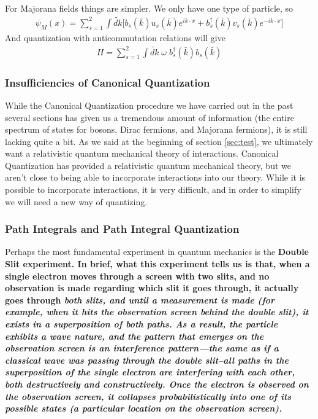 \documentclass[12pt,epsf]{article}
\def\nolabel{\nonumber }
\def\nolabel{\nonumber }
\begin{document}
For Majorana fields things are simpler.  We only have one type of
particle, so 
\begin{eqnarray}
\psi_M(x) = \sum_{s=1}^2 \int \widetilde{dk}\big[b_s(\bar k)u_s(\bar
k)e^{ik\cdot x} + b^{\dagger}_s(\bar k)v_s(\bar k)e^{-ik\cdot
x}\big]\nolabel
\end{eqnarray}
And quantization with anticommutation relations will give
\begin{eqnarray}
H = \sum_{s=1}^2\int \widetilde{dk}\; \omega \; b^{\dagger}_s(\bar k
)b_s(\bar k )\nolabel
\end{eqnarray}

\subsubsection{Insufficiencies of Canonical Quantization}

While the Canonical Quantization procedure we have carried out in the
past several sections has given us a tremendous amount of information
(the entire spectrum of states for bosons, Dirac fermions, and Majorana
fermions), it is still lacking quite a bit.  As we said at the
beginning of section \ref{sec:test}, we ultimately want a relativistic
quantum mechanical theory of interactions.  Canonical Quantization has
provided a relativistic quantum mechanical theory, but we aren't close
to being able to incorporate interactions into our theory.  While it is
possible to incorporate interactions, it is very difficult, and in
order to simplify we will need a new way of quantizing.  

\subsubsection{Path Integrals and Path Integral Quantization}

Perhaps the most fundamental experiment in quantum mechanics is the \bf
Double Slit \rm experiment.  In brief, what this experiment tells us is
that, when a single electron moves through a screen with two slits, and
no observation is made regarding which slit it goes through, it
actually goes through \it both \rm slits, and until a measurement is
made (for example, when it hits the observation screen behind the
double slit), it exists in a superposition of \it both \rm paths.  As a
result, the particle exhibits a wave nature, and the pattern that
emerges on the observation screen is an interference pattern---the same
as if a classical wave was passing through the double slit--all paths
in the superposition of the single electron are interfering with each
other, both destructively and constructively.  Once the electron is
observed on the observation screen, it collapses probabilistically into
one of its possible states (a particular location on the observation
screen).  
\end{document}
